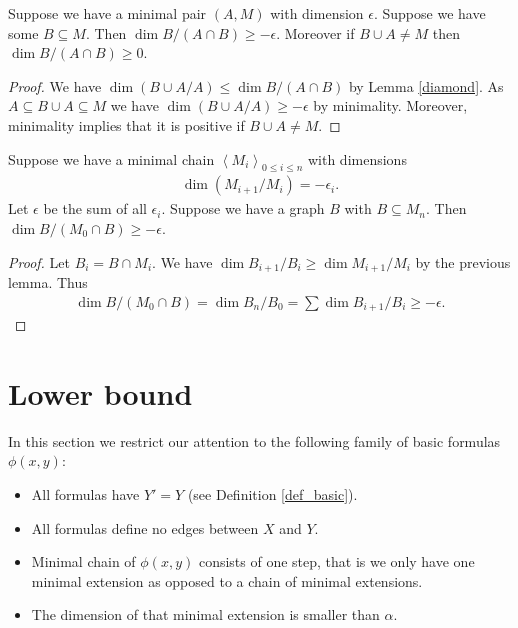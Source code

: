 \documentclass{amsart}
\newcommand{\X}{X}
\newcommand{\Y}{Y}
\newcommand{\agl}[1]{\left\langle #1 \right\rangle}
\begin{document}
\begin{Lemma} \label{minimal_subset}
  Suppose we have a minimal pair $(A, M)$ with dimension $\epsilon$.
  Suppose we have some $B \subseteq M$.
  Then $\dim B / (A \cap B) \geq -\epsilon$.
  Moreover if $B \cup A \neq M$ then $\dim B / (A \cap B) \geq 0$.
\end{Lemma}

\begin{proof}
  We have $\dim (B \cup A / A) \leq \dim B / (A \cap B)$ by Lemma \ref{diamond}.
  As $A \subseteq B \cup A \subseteq M$ we have $\dim (B \cup A / A) \geq -\epsilon$ by minimality.
  Moreover, minimality implies that it is positive if $B \cup A \neq M$.
\end{proof}

\begin{Lemma} \label{chain_intersect}
  Suppose we have a minimal chain  $\agl{M_i}_{0 \leq i \leq n}$ with dimensions
  \begin{align*}
    \dim(M_{i+1}/M_i) = -\epsilon_i.
  \end{align*}
  Let $\epsilon$ be the sum of all $\epsilon_i$.
  Suppose we have a graph $B$ with $B \subseteq M_n$.
  Then $\dim B / (M_0 \cap B) \geq -\epsilon$.
\end{Lemma}

\begin{proof}
  Let $B_i = B \cap M_i$.
  We have $\dim B_{i+1}/B_i \geq \dim M_{i+1}/M_i$ by the previous lemma.
  Thus
  \begin{align*}
    \dim B / (M_0 \cap B) = \dim B_n / B_0 = \sum \dim B_{i+1}/B_i \geq -\epsilon.
  \end{align*}
\end{proof}

\section{Lower bound}

In this section we restrict our attention to the following family of basic formulas $\phi(x,y)$:
\begin{itemize}
\item All formulas have $\Y' = \Y$ (see Definition \ref{def_basic}).
\item All formulas define no edges between $X$ and $Y$.
\item Minimal chain of $\phi(x,y)$ consists of one step, that is we only have one minimal extension as opposed to a chain of minimal extensions.
\item The dimension of that minimal extension is smaller than $\alpha$.
\end{itemize}
\end{document}
